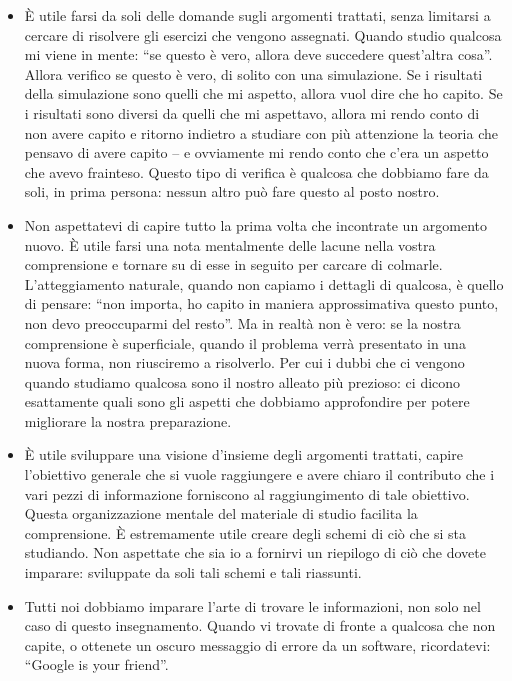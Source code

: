 \documentclass[
  11pt,
  italian,
  a4paper,
  extrafontsizes,onecolumn,openright
  ]{memoir}
\newlength{\rf}
\begin{document}
\begin{itemize}
\item
  È utile farsi da soli delle domande sugli argomenti trattati, senza limitarsi a cercare di risolvere gli esercizi che vengono assegnati. Quando studio qualcosa mi viene in mente: ``se questo è vero, allora deve succedere quest'altra cosa''. Allora verifico se questo è vero, di solito con una simulazione. Se i risultati della simulazione sono quelli che mi aspetto, allora vuol dire che ho capito. Se i risultati sono diversi da quelli che mi aspettavo, allora mi rendo conto di non avere capito e ritorno indietro a studiare con più attenzione la teoria che pensavo di avere capito -- e ovviamente mi rendo conto che c'era un aspetto che avevo frainteso. Questo tipo di verifica è qualcosa che dobbiamo fare da soli, in prima persona: nessun altro può fare questo al posto nostro.
\item
  Non aspettatevi di capire tutto la prima volta che incontrate un argomento nuovo. È utile farsi una nota mentalmente delle lacune nella vostra comprensione e tornare su di esse in seguito per carcare di colmarle. L'atteggiamento naturale, quando non capiamo i dettagli di qualcosa, è quello di pensare: ``non importa, ho capito in maniera approssimativa questo punto, non devo preoccuparmi del resto''. Ma in realtà non è vero: se la nostra comprensione è superficiale, quando il problema verrà presentato in una nuova forma, non riusciremo a risolverlo. Per cui i dubbi che ci vengono quando studiamo qualcosa sono il nostro alleato più prezioso: ci dicono esattamente quali sono gli aspetti che dobbiamo approfondire per potere migliorare la nostra preparazione.
\item
  È utile sviluppare una visione d'insieme degli argomenti trattati, capire l'obiettivo generale che si vuole raggiungere e avere chiaro il contributo che i vari pezzi di informazione forniscono al raggiungimento di tale obiettivo. Questa organizzazione mentale del materiale di studio facilita la comprensione. È estremamente utile creare degli schemi di ciò che si sta studiando. Non aspettate che sia io a fornirvi un riepilogo di ciò che dovete imparare: sviluppate da soli tali schemi e tali riassunti.
\item
  Tutti noi dobbiamo imparare l'arte di trovare le informazioni, non solo nel caso di questo insegnamento. Quando vi trovate di fronte a qualcosa che non capite, o ottenete un oscuro messaggio di errore da un software, ricordatevi: ``Google is your friend''.
\end{itemize}

\bigskip
\end{document}
